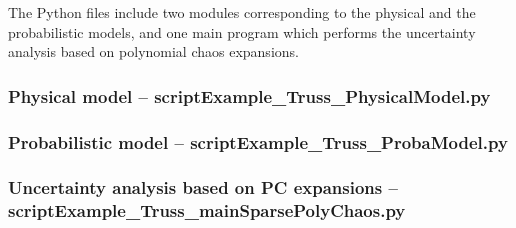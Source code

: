\documentclass[11pt]{article}
\begin{document}
The Python files include two modules corresponding to the physical and the probabilistic models, and one main program which performs the uncertainty analysis based on polynomial chaos expansions.

\subsubsection{Physical model -- \textsf{scriptExample\_Truss\_PhysicalModel.py}}


\subsubsection{Probabilistic model -- \textsf{scriptExample\_Truss\_ProbaModel.py}}


\subsubsection{Uncertainty analysis based on PC expansions -- \textsf{scriptExample\_Truss\_mainSparsePolyChaos.py}}

\end{document}
